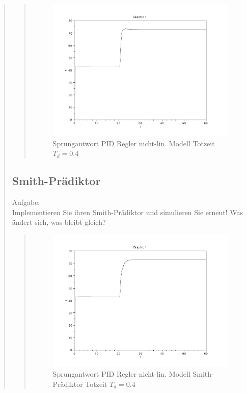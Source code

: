 \begin{quote}
    \begin{quote}
        \begin{figure}[H]
        \centering
            \includegraphics[scale=0.7, trim = 0cm 0cm 0cm 0cm, clip]{./Bilder/4_2_Td_04}
                \caption{Sprungantwort PID Regler nicht-lin. Modell Totzeit $T_d = 0.4$}
        \end{figure}
    
    \end{quote}
    
    
    \subsection{Smith-Prädiktor}
    Aufgabe:\\
    Implementieren Sie ihren Smith-Prädiktor und simulieren Sie erneut! Was ändert sich, was bleibt gleich?\vspace{1em}
    
    \begin{quote}
        \begin{figure}[H]
        \centering
            \includegraphics[scale=0.7, trim = 0cm 0cm 0cm 0cm, clip]{./Bilder/4_3_Td_04}
                \caption{Sprungantwort PID Regler nicht-lin. Modell Smith-Prädiktor Totzeit $T_d = 0.4$}
        \end{figure}
    

\end{quote}
\end{quote}
